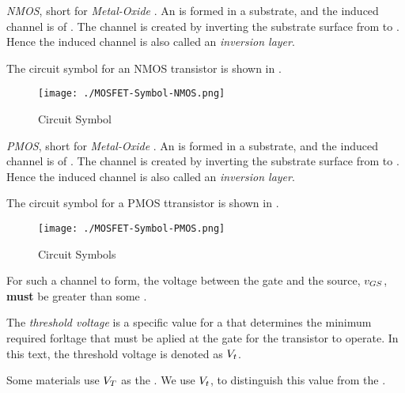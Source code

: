 \begin{definition}[NMOS]\label{def:NMOS}
  \emph{NMOS}, short for \emph{ Metal-Oxide }.
  An   is formed in a \PType{} substrate, and the induced channel is of \PType{}.
  The channel is created by inverting the substrate surface from \PType{} to \NType{}.
  Hence the induced channel is also called an \emph{inversion layer}.

  The circuit symbol for an NMOS transistor is shown in .
\end{definition}

\begin{figure}[h!tbp]
  \centering
  \texttt{[image: ./MOSFET-Symbol-NMOS.png]}
  \caption{  Circuit Symbol \parencite[p.~265]{sedraTextbook7}}
  \label{fig:MOSFET-Symbol-NMOS}
\end{figure}

\begin{definition}[PMOS]\label{def:PMOS}
  \emph{PMOS}, short for \emph{ Metal-Oxide }.
  An   is formed in a \NType{} substrate, and the induced channel is of \PType{}.
  The channel is created by inverting the substrate surface from \NType{} to \PType{}.
  Hence the induced channel is also called an \emph{inversion layer}.

  The circuit symbol for a PMOS ttransistor is shown in .
\end{definition}

\begin{figure}[h!tbp]
  \centering
  \texttt{[image: ./MOSFET-Symbol-PMOS.png]}
  \caption{  Circuit Symbols \parencite[p.274]{sedraTextbook7}}
  \label{fig:MOSFET-Symbol-PMOS}
\end{figure}

For such a channel to form, the voltage between the gate and the source, $v_{GS}$, \textbf{must} be greater than some .

\begin{definition}\label{def:Threshold_Voltage}
  The \emph{threshold voltage} is a specific value for a  that determines the minimum required forltage that must be aplied at the gate for the transistor to operate.
  In this text, the threshold voltage is denoted as $V_{t}$.

  \begin{remark}[Notation]
    Some materials use $V_{T}$ as the .
    We use $V_{t}$, to distinguish this value from the .
  \end{remark}
\end{definition}


